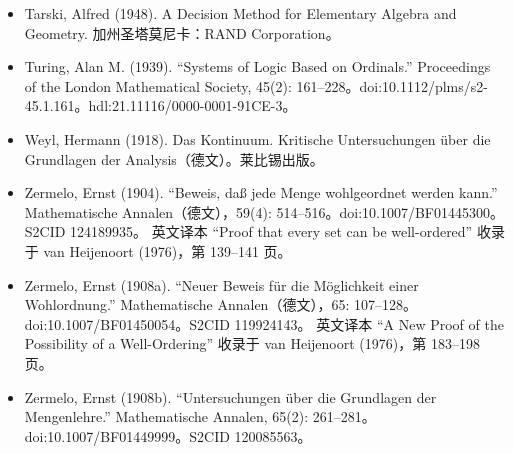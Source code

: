  \begin{itemize}
  \item Tarski, Alfred (1948). A Decision Method for Elementary Algebra and Geometry. 加州圣塔莫尼卡：RAND Corporation。
  \item Turing, Alan M. (1939). “Systems of Logic Based on Ordinals.” Proceedings of the London Mathematical Society, 45(2): 161–228。doi:10.1112/plms/s2-45.1.161。hdl:21.11116/0000-0001-91CE-3。
  \item Weyl, Hermann (1918). Das Kontinuum. Kritische Untersuchungen über die Grundlagen der Analysis（德文）。莱比锡出版。
  \item Zermelo, Ernst (1904). “Beweis, daß jede Menge wohlgeordnet werden kann.” Mathematische Annalen（德文），59(4): 514–516。doi:10.1007/BF01445300。S2CID 124189935。  
        英文译本 “Proof that every set can be well-ordered” 收录于 van Heijenoort (1976)，第 139–141 页。
  \item Zermelo, Ernst (1908a). “Neuer Beweis für die Möglichkeit einer Wohlordnung.” Mathematische Annalen（德文），65: 107–128。doi:10.1007/BF01450054。S2CID 119924143。  
        英文译本 “A New Proof of the Possibility of a Well-Ordering” 收录于 van Heijenoort (1976)，第 183–198 页。
  \item Zermelo, Ernst (1908b). “Untersuchungen über die Grundlagen der Mengenlehre.” Mathematische Annalen, 65(2): 261–281。doi:10.1007/BF01449999。S2CID 120085563。
 \end{itemize}
